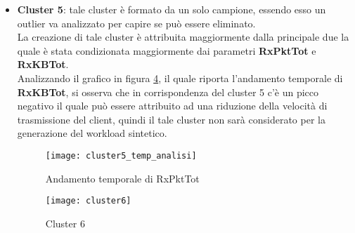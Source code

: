 \begin{itemize}
  \begin{figure}[!htbp]
    \centering
    \texttt{[image: cluster41]}
    \caption{Cluster 4.1}
    \label{cluster41}
  \end{figure}

  \begin{figure}[!htbp]
    \centering
    \texttt{[image: cluster42]}
    \caption{Cluster 4.2}
    \label{cluster42}
  \end{figure}

  \clearpage

  \begin{figure}[!htbp]
    \centering
    \texttt{[image: cluster5]}
    \caption{Cluster 5}
    \label{cluster5}
  \end{figure}

  \item \textbf{Cluster 5}: tale cluster è formato da un solo campione, essendo
  esso un outlier va analizzato per capire se può essere eliminato.\\
  La creazione di tale cluster è attribuita maggiormente dalla principale
  due la quale è stata condizionata maggiormente dai parametri \textbf{RxPktTot}
  e \textbf{RxKBTot}.\\
  Analizzando il grafico in figura \ref{cluster5_temp_analisi}, il quale riporta
  l'andamento temporale di \textbf{RxKBTot}, si osserva che in corrispondenza del
  cluster 5 c'è un picco negativo il quale può essere attribuito ad una riduzione
  della velocità di trasmissione del client, quindi il tale cluster non sarà
  considerato per la generazione del workload sintetico.\\

  \begin{figure}[!htbp]
    \centering
    \texttt{[image: cluster5\_temp\_analisi]}
    \caption{Andamento temporale di RxPktTot}
    \label{cluster5_temp_analisi}
  \end{figure}

  \clearpage

  \begin{figure}[!htbp]
    \centering
    \texttt{[image: cluster6]}
    \caption{Cluster 6}
    \label{cluster6}
  \end{figure}


\end{itemize}
